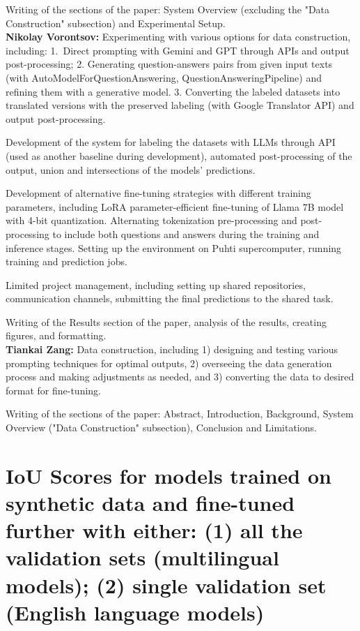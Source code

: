 \documentclass[11pt]{article}
\begin{document}
Writing of the sections of the paper: System Overview (excluding the "Data Construction" subsection) and Experimental Setup.
\\

\noindent
\textbf{Nikolay Vorontsov: } Experimenting with various options for data construction, including: 1.~Direct prompting with Gemini and GPT through APIs and output post-processing; 2. Generating question-answers pairs from given input texts (with AutoModelForQuestionAnswering, QuestionAnsweringPipeline) and refining them with a generative model. 3. Converting the labeled datasets into translated versions with the preserved labeling (with Google Translator API) and output post-processing.

Development of the system for labeling the datasets with LLMs through API (used as another baseline during development), automated post-processing of the output, union and intersections of the models' predictions.

Development of alternative fine-tuning strategies with different training parameters, including LoRA parameter-efficient fine-tuning of Llama 7B model with 4-bit quantization. Alternating tokenization pre-processing and post-processing to include both questions and answers during the training and inference stages. Setting up the environment on Puhti supercomputer, running training and prediction jobs. 

Limited project management, including setting up shared repositories, communication channels, submitting the final predictions to the shared task.

Writing of the Results section of the paper, analysis of the results, creating figures, and formatting.
\\

\noindent
\textbf{Tiankai Zang: } Data construction, including 1) designing and testing various prompting techniques for optimal outputs, 2) overseeing the data generation process and making adjustments as needed, and 3) converting the data to desired format for fine-tuning. 

Writing of the sections of the paper: Abstract, Introduction, Background, System Overview ("Data Construction" subsection), Conclusion and Limitations.





\newpage

\appendix
\clearpage

\onecolumn
\section{IoU Scores for models trained on synthetic data and fine-tuned further with either: (1) all the validation sets (multilingual models); (2) single validation set (English language models)}
\label{sec:iou_scores_appendix}
\end{document}
